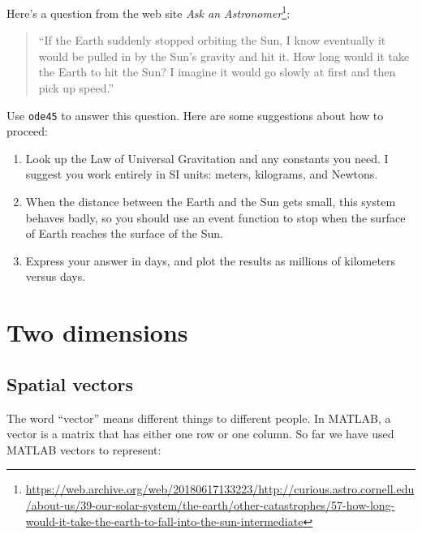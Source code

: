 \documentclass[
]{book}
\numberwithin{Answer}{chapter}
\numberwithin{Exercise}{chapter}
\begin{document}
\begin{ex}
\label{ex:earth}

Here's a question from the web site {\em Ask an Astronomer}\footnote{\url{https://web.archive.org/web/20180617133223/http://curious.astro.cornell.edu/about-us/39-our-solar-system/the-earth/other-catastrophes/57-how-long-would-it-take-the-earth-to-fall-into-the-sun-intermediate}}:

\begin{quote}
``If the Earth suddenly stopped orbiting the Sun, I know eventually it would be pulled in by the Sun's gravity and hit it. How long would it take the Earth to hit the Sun? I imagine it would go slowly at first and then pick up speed.''
\end{quote}

Use {\tt ode45} to answer this question.  Here are some suggestions about how to proceed:

\begin{enumerate}

\item Look up the Law of Universal Gravitation and any constants you need. I suggest you work entirely in SI units: meters, kilograms, and Newtons.

\item When the distance between the Earth and the Sun gets small, this system behaves badly, so you should use an event function to stop when the surface of Earth reaches the surface of the Sun.

\item Express your answer in days, and plot the results as millions of kilometers versus days.

\end{enumerate}

\end{ex}


\chapter{Two dimensions}

\section{Spatial vectors}
\label{sect:spacial}

The word ``vector'' means different
things to different people.  In MATLAB, a vector is a matrix that has
either one row or one column.  So far we have used MATLAB vectors to
represent:
\end{document}
